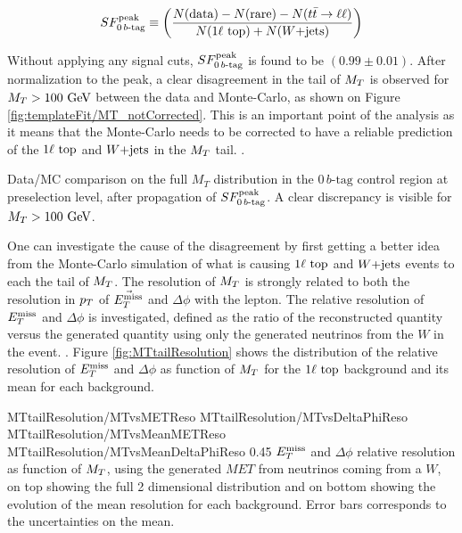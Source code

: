     \begin{equation}
        SF_{0\, b\text{-tag}}^{\text{peak}} \equiv \left( \frac{N(\text{data}) - N(\text{rare}) - N(t\bar{t} \rightarrow \ell \ell)}{N(1\ell~\text{top}) + N(\text{$W$+jets})} \right)
        \label{eq:SF0btagDefinition}
    \end{equation}

    Without applying any signal cuts, $SF_{0\, b\text{-tag}}^{\text{peak}}$ is found to be $(0.99 \pm 0.01)$. 
    After normalization to the peak, a clear disagreement in the tail of $M_T$ is observed 
    for $M_T > 100 ~\text{GeV}$ between the data and Monte-Carlo, as shown on Figure 
    \ref{fig:templateFit/MT_notCorrected}. This is an important point of the analysis as 
    it means that the Monte-Carlo needs to be corrected to have a reliable prediction of 
    the $1\ell~\text{top}$ and $\text{$W$+jets}$ in the $M_T$ tail. . 

                 {Data/MC comparison on the full $M_T$ distribution in the $0\, b\text{-tag}$ control 
                 region at preselection level, after propagation of $SF_{0\, b\text{-tag}}^{\text{peak}}$. A clear 
                 discrepancy is visible for $M_T > 100 ~\text{GeV}$.}

    One can investigate the cause of the disagreement by first getting a better idea from 
    the Monte-Carlo simulation of what is causing $1\ell~\text{top}$ and $\text{$W$+jets}$ events
    to each the tail of $M_T$. The resolution of $M_T$ is strongly related to both the
    resolution in $p_T$ of $\vec{E_T^\text{miss}}$ and $\Delta\phi$ with the lepton. The relative 
    resolution of $E_T^\text{miss}$ and $\Delta \phi$ is investigated, defined as the ratio of the 
    reconstructed quantity versus the generated quantity using only the generated 
    neutrinos from the $W$ in the event. . Figure \ref{fig:MTtailResolution} shows the distribution of the relative
    resolution of $E_T^\text{miss}$ and $\Delta \phi$ as function of $M_T$ for the $1\ell~\text{top}$
    background and its mean for each background.

                      {MTtailResolution/MTvsMETReso}
                      {MTtailResolution/MTvsDeltaPhiReso}
                      {MTtailResolution/MTvsMeanMETReso}
                      {MTtailResolution/MTvsMeanDeltaPhiReso}
                      {0.45}
                      {$E_T^\text{miss}$ and $\Delta \phi$ relative resolution as function of $M_T$, 
                      using the generated $MET$ from neutrinos coming from a $W$, on top 
                      showing the full 2 dimensional distribution and on bottom showing 
                      the evolution of the mean resolution for each background. Error
                      bars corresponds to the uncertainties on the mean.}

